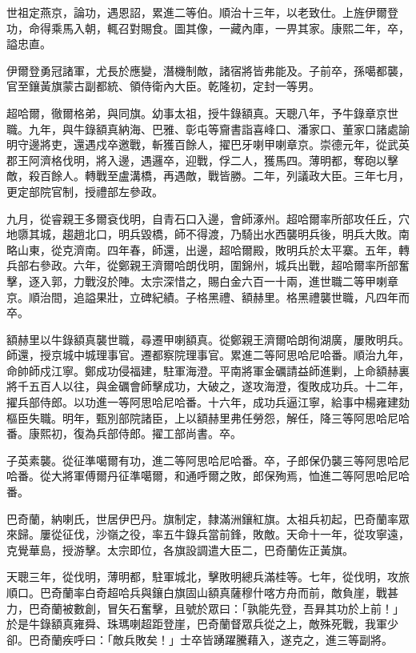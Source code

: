 \begin{pinyinscope}
世祖定燕京，論功，遇恩詔，累進二等伯。順治十三年，以老致仕。上旌伊爾登功，命得乘馬入朝，輒召對賜食。圖其像，一藏內庫，一畀其家。康熙二年，卒，謚忠直。

伊爾登勇冠諸軍，尤長於應變，潛機制敵，諸宿將皆弗能及。子前卒，孫噶都襲，官至鑲黃旗蒙古副都統、領侍衛內大臣。乾隆初，定封一等男。

超哈爾，徹爾格弟，與同旗。幼事太祖，授牛錄額真。天聰八年，予牛錄章京世職。九年，與牛錄額真納海、巴雅、彰屯等齎書詣喜峰口、潘家口、董家口諸處諭明守邊將吏，還遇戍卒邀戰，斬獲百餘人，擢巴牙喇甲喇章京。崇德元年，從武英郡王阿濟格伐明，將入邊，遇邏卒，迎戰，俘二人，獲馬四。薄明都，奪砲以擊敵，殺百餘人。轉戰至盧溝橋，再遇敵，戰皆勝。二年，列議政大臣。三年七月，更定部院官制，授禮部左參政。

九月，從睿親王多爾袞伐明，自青石口入邊，會師涿州。超哈爾率所部攻任丘，穴地隳其城，趨趙北口，明兵毀橋，師不得渡，乃騎出水西襲明兵後，明兵大敗。南略山東，從克濟南。四年春，師還，出邊，超哈爾殿，敗明兵於太平寨。五年，轉兵部右參政。六年，從鄭親王濟爾哈朗伐明，圍錦州，城兵出戰，超哈爾率所部奮擊，逐入郭，力戰沒於陣。太宗深惜之，賜白金六百一十兩，進世職二等甲喇章京。順治間，追謚果壯，立碑紀績。子格黑禮、額赫里。格黑禮襲世職，凡四年而卒。

額赫里以牛錄額真襲世職，尋遷甲喇額真。從鄭親王濟爾哈朗徇湖廣，屢敗明兵。師還，授京城中城理事官。遷都察院理事官。累進二等阿思哈尼哈番。順治九年，命帥師戍江寧。鄭成功侵福建，駐軍海澄。平南將軍金礪請益師進剿，上命額赫裏將千五百人以往，與金礪會師擊成功，大破之，遂攻海澄，復敗成功兵。十二年，擢兵部侍郎。以功進一等阿思哈尼哈番。十六年，成功兵逼江寧，給事中楊雍建劾樞臣失職。明年，甄別部院諸臣，上以額赫里弗任勞怨，解任，降三等阿思哈尼哈番。康熙初，復為兵部侍郎。擢工部尚書。卒。

子英素襲。從征準噶爾有功，進二等阿思哈尼哈番。卒，子郎保仍襲三等阿思哈尼哈番。從大將軍傅爾丹征準噶爾，和通呼爾之敗，郎保殉焉，恤進二等阿思哈尼哈番。

巴奇蘭，納喇氏，世居伊巴丹。旗制定，隸滿洲鑲紅旗。太祖兵初起，巴奇蘭率眾來歸。屢從征伐，沙嶺之役，率五牛錄兵當前鋒，敗敵。天命十一年，從攻寧遠，克覺華島，授游擊。太宗即位，各旗設調遣大臣二，巴奇蘭佐正黃旗。

天聰三年，從伐明，薄明都，駐軍城北，擊敗明總兵滿桂等。七年，從伐明，攻旅順口。巴奇蘭率白奇超哈兵與鑲白旗固山額真薩穆什喀方舟而前，敵負崖，戰甚力，巴奇蘭被數創，冒矢石奮擊，且號於眾曰：「孰能先登，吾昪其功於上前！」於是牛錄額真雍舜、珠瑪喇超距登崖，巴奇蘭督眾兵從之上，敵殊死戰，我軍少卻。巴奇蘭疾呼曰：「敵兵敗矣！」士卒皆踴躍騰藉入，遂克之，進三等副將。


\end{pinyinscope}
